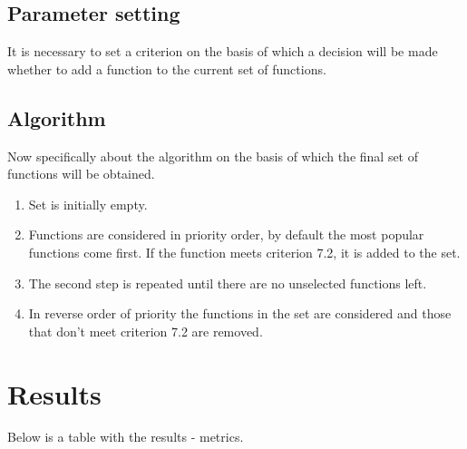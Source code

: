 \documentclass[anonymous,sigplan,review,11pt,nonacm,natbib=false]{acmart}
\begin{document}
    \subsection{Parameter setting}

    It is necessary to set a criterion on the basis of which a decision will be made whether to add a function to the current set of functions.

    \subsection{Algorithm}

    Now specifically about the algorithm on the basis of which the final set of functions will be obtained.

    \begin{enumerate}
        \item Set is initially empty.
        \item Functions are considered in priority order, by default the most popular functions come first. If the function meets criterion 7.2, it is added to the set.
        \item The second step is repeated until there are no unselected functions left.
        \item In reverse order of priority the functions in the set are considered and those that don't meet criterion 7.2 are removed.
    \end{enumerate}

    \section{Results}

    Below is a table with the results - metrics.
\end{document}
